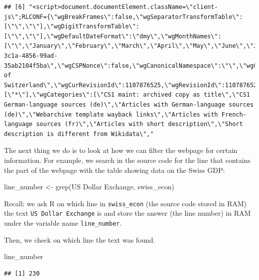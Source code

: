\documentclass[
  12pt,
]{style/krantz}
\newenvironment{Shaded}{\begin{snugshade}}{\end{snugshade}}
\newcommand{\FunctionTok}[1]{\textcolor[rgb]{0.00,0.00,0.00}{#1}}
\newcommand{\NormalTok}[1]{#1}
\newcommand{\OtherTok}[1]{\textcolor[rgb]{0.56,0.35,0.01}{#1}}
\newcommand{\StringTok}[1]{\textcolor[rgb]{0.31,0.60,0.02}{#1}}
\begin{document}
\begin{verbatim}
## [6] "<script>document.documentElement.className=\"client-js\";RLCONF={\"wgBreakFrames\":false,\"wgSeparatorTransformTable\":[\"\",\"\"],\"wgDigitTransformTable\":[\"\",\"\"],\"wgDefaultDateFormat\":\"dmy\",\"wgMonthNames\":[\"\",\"January\",\"February\",\"March\",\"April\",\"May\",\"June\",\"July\",\"August\",\"September\",\"October\",\"November\",\"December\"],\"wgRequestId\":\"06d9bfe6-3c1a-4856-99ad-35ab2104f5ba\",\"wgCSPNonce\":false,\"wgCanonicalNamespace\":\"\",\"wgCanonicalSpecialPageName\":false,\"wgNamespaceNumber\":0,\"wgPageName\":\"Economy_of_Switzerland\",\"wgTitle\":\"Economy of Switzerland\",\"wgCurRevisionId\":1107876525,\"wgRevisionId\":1107876525,\"wgArticleId\":27465,\"wgIsArticle\":true,\"wgIsRedirect\":false,\"wgAction\":\"view\",\"wgUserName\":null,\"wgUserGroups\":[\"*\"],\"wgCategories\":[\"CS1 maint: archived copy as title\",\"CS1 German-language sources (de)\",\"Articles with German-language sources (de)\",\"Webarchive template wayback links\",\"Articles with French-language sources (fr)\",\"Articles with short description\",\"Short description is different from Wikidata\","
\end{verbatim}

The next thing we do is to look at how we can filter the webpage for certain information. For example, we search in the source code for the line that contains the part of the webpage with the table showing data on the Swiss GDP:

\begin{Shaded}
\begin{Highlighting}[]
\NormalTok{line\_number }\OtherTok{\textless{}{-}} \FunctionTok{grep}\NormalTok{(}\StringTok{\textquotesingle{}US Dollar Exchange\textquotesingle{}}\NormalTok{, swiss\_econ)}
\end{Highlighting}
\end{Shaded}

Recall: we ask R on which line in \texttt{swiss\_econ} (the source code stored in RAM) the text \texttt{US\ Dollar\ Exchange} is and store the answer (the line number) in RAM under the variable name \texttt{line\_number}.

Then, we check on which line the text was found.

\begin{Shaded}
\begin{Highlighting}[]
\NormalTok{line\_number}
\end{Highlighting}
\end{Shaded}

\begin{verbatim}
## [1] 230
\end{verbatim}
\end{document}
